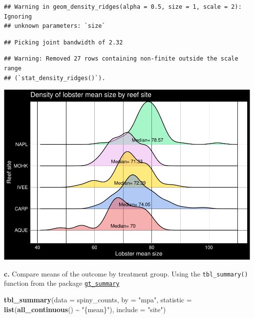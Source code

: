 \documentclass[
]{article}
\newenvironment{Shaded}{\begin{snugshade}}{\end{snugshade}}
\newcommand{\AttributeTok}[1]{\textcolor[rgb]{0.13,0.29,0.53}{#1}}
\newcommand{\FunctionTok}[1]{\textcolor[rgb]{0.13,0.29,0.53}{\textbf{#1}}}
\newcommand{\NormalTok}[1]{#1}
\newcommand{\SpecialCharTok}[1]{\textcolor[rgb]{0.81,0.36,0.00}{\textbf{#1}}}
\newcommand{\StringTok}[1]{\textcolor[rgb]{0.31,0.60,0.02}{#1}}
\begin{document}
\begin{verbatim}
## Warning in geom_density_ridges(alpha = 0.5, size = 1, scale = 2): Ignoring
## unknown parameters: `size`
\end{verbatim}

\begin{verbatim}
## Picking joint bandwidth of 2.32
\end{verbatim}

\begin{verbatim}
## Warning: Removed 27 rows containing non-finite outside the scale range
## (`stat_density_ridges()`).
\end{verbatim}

\includegraphics{hw1-lobstrs-eds241_files/figure-latex/unnamed-chunk-11-1.pdf}

\textbf{c.} Compare means of the outcome by treatment group. Using the
\texttt{tbl\_summary()} function from the package
\href{https://www.danieldsjoberg.com/gtsummary/articles/tbl_summary.html}{\texttt{gt\_summary}}

\begin{Shaded}
\begin{Highlighting}[]
\FunctionTok{tbl\_summary}\NormalTok{(}\AttributeTok{data =}\NormalTok{ spiny\_counts,}
            \AttributeTok{by =} \StringTok{"mpa"}\NormalTok{,}
            \AttributeTok{statistic =} \FunctionTok{list}\NormalTok{(}\FunctionTok{all\_continuous}\NormalTok{() }\SpecialCharTok{\textasciitilde{}} \StringTok{"\{mean\}"}\NormalTok{),}
            \AttributeTok{include =} \StringTok{"site"}\NormalTok{)}
\end{Highlighting}
\end{Shaded}
\end{document}
